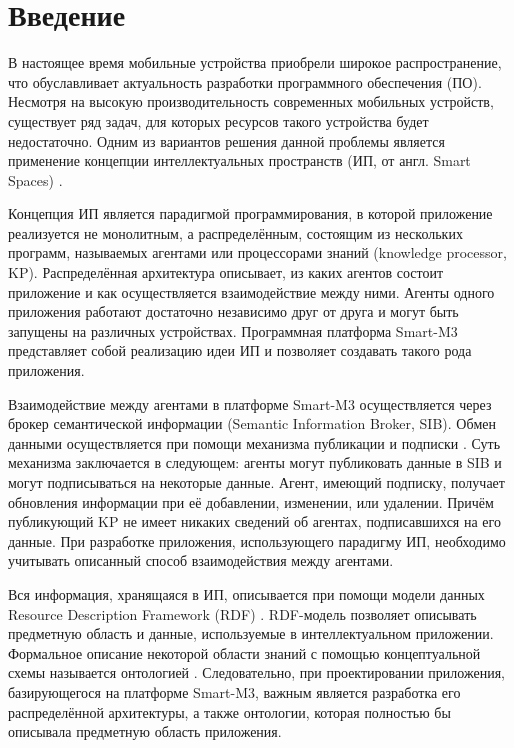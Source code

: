 

\chapter*{Введение}

В настоящее время мобильные устройства приобрели широкое распространение, что обуславливает актуальность разработки программного обеспечения (ПО). Несмотря на высокую производительность современных мобильных устройств, существует ряд задач, для которых ресурсов такого устройства будет недостаточно. Одним из вариантов решения данной проблемы является применение концепции интеллектуальных пространств (ИП, от англ. Smart Spaces) \cite{oliver:dynamic}.

Концепция ИП является парадигмой программирования, в которой приложение реализуется не монолитным, а распределённым, состоящим из нескольких программ, называемых агентами или процессорами знаний (knowledge processor, KP). Распределённая архитектура описывает, из каких агентов состоит приложение и как осуществляется взаимодействие между ними. Агенты
одного приложения работают достаточно независимо друг от друга и могут быть запущены на различных устройствах.
Программная платформа Smart-M3 \cite{honkola:smart-m3} представляет собой реализацию идеи ИП и позволяет создавать такого рода приложения. 

Взаимодействие между агентами в платформе Smart-M3 осуществляется через брокер семантической информации (Semantic Information Broker, SIB). Обмен данными осуществляется при помощи механизма публикации и подписки \cite{baldoni:evolution}. Суть механизма заключается
в следующем: агенты могут публиковать данные в SIB и могут подписываться на некоторые данные.
Агент, имеющий подписку, получает обновления информации при её добавлении, изменении, или удалении. Причём публикующий KP не имеет никаких сведений об агентах, подписавшихся на его данные. При разработке приложения, использующего парадигму ИП, необходимо учитывать описанный способ взаимодействия между агентами.

Вся информация, хранящаяся в ИП, описывается при помощи модели данных Resource Description Framework (RDF) \cite{rdf}. 
RDF-модель позволяет описывать предметную область и данные, используемые в интеллектуальном приложении.
Формальное описание некоторой области знаний с помощью концептуальной схемы называется онтологией \cite{guarino}. Следовательно, при проектировании приложения, базирующегося на платформе Smart-M3, важным является разработка его распределённой архитектуры, а также онтологии, которая полностью бы описывала предметную область приложения.

